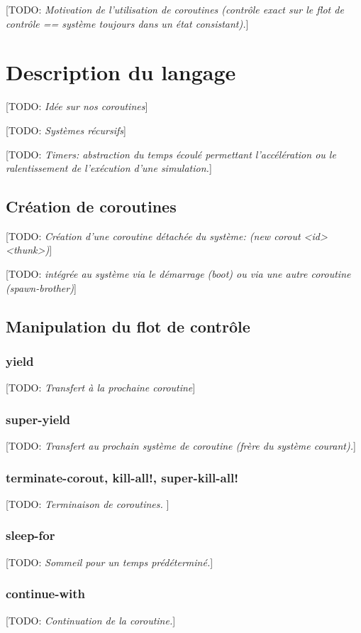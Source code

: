 \documentclass[12pt,oneside,letterpaper,francais]{book}
\newcommand{\todo}[1]{[TODO: {\it #1}]}
\begin{document}
\todo{Motivation de l'utilisation de coroutines (contrôle exact sur le
  flot de contrôle == système toujours dans un état consistant).}

\section{Description du langage}
\todo{Idée sur nos coroutines}

\todo{Systèmes récursifs}

\todo{Timers: abstraction du temps écoulé permettant l'accélération ou
  le ralentissement de l'exécution d'une simulation.}

\subsection{Création de coroutines}
\todo{Création d'une coroutine détachée du système: (new corout <id>
  <thunk>)}

\todo{intégrée au système via le démarrage (boot) ou via une autre
  coroutine (spawn-brother)}

\subsection{Manipulation du flot de contrôle}
\subsubsection{yield} 
\todo{Transfert à la prochaine coroutine}

\subsubsection{super-yield} 
\todo{Transfert au prochain système de coroutine (frère du système courant).}

\subsubsection{terminate-corout, kill-all!, super-kill-all!}
\todo{Terminaison de coroutines. }

\subsubsection{sleep-for}
\todo{Sommeil pour un temps prédéterminé.}

\subsubsection{continue-with}
\todo{Continuation de la coroutine.}
\end{document}
